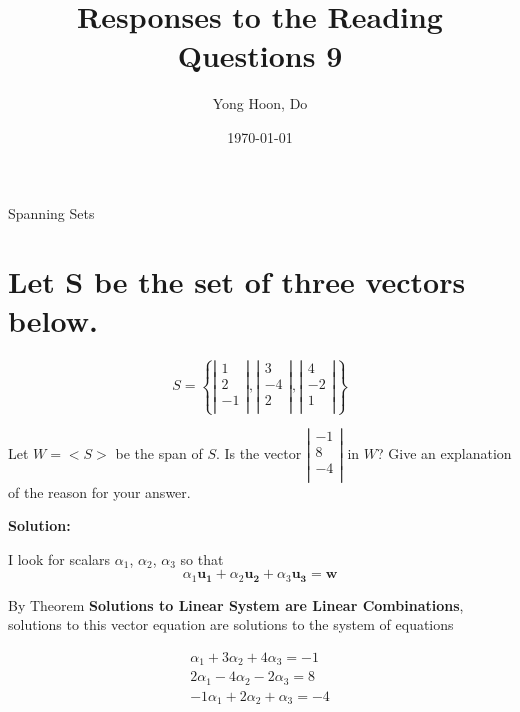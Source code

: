 \documentclass{article}
\title{Responses to the Reading Questions 9}
\author{Yong Hoon, Do}
\date{\today}
\begin{document}
\maketitle

\begin{center}
Spanning Sets
\end{center}

\section{Let S be the set of three vectors below.}

\[
S=
\left\{
\left|
\begin{array}{c}
  1 \\
  2 \\
  -1 \\
\end{array}
\right|
,
\left|
\begin{array}{c}
  3 \\
  -4 \\
  2 \\
\end{array}
\right|
,
\left|
\begin{array}{c}
  4 \\
  -2 \\
  1 \\
\end{array}
\right|
\right\}
\]

Let \(W=<S>\) be the span of \(S\). Is the vector
\(
\left|
\begin{array}{c}
  -1 \\ 8 \\ -4 \\
\end{array}
\right|
\)
in \(W\)? Give an explanation of the reason for your answer.

\bigskip

\textbf{Solution:}

I look for scalars \(\alpha_1\), \(\alpha_2\), \(\alpha_3\) so that
\begin{equation}
  \alpha_1 \bm{u_1} + \alpha_2 \bm{u_2} + \alpha_3 \bm{u_3} = \bm{w}
\end{equation}

By Theorem \textbf{Solutions to Linear System are Linear Combinations}, solutions to this
vector equation are solutions to the system of equations

\begin{equation}
  \begin{array}{ccc}
    \alpha_1 + 3\alpha_2 + 4\alpha_3 = -1 \\
    2\alpha_1 - 4\alpha_2 - 2\alpha_3 = 8 \\
    -1\alpha_1 + 2\alpha_2 + \alpha_3 = -4 \\
  \end{array}
\end{equation}
\end{document}
